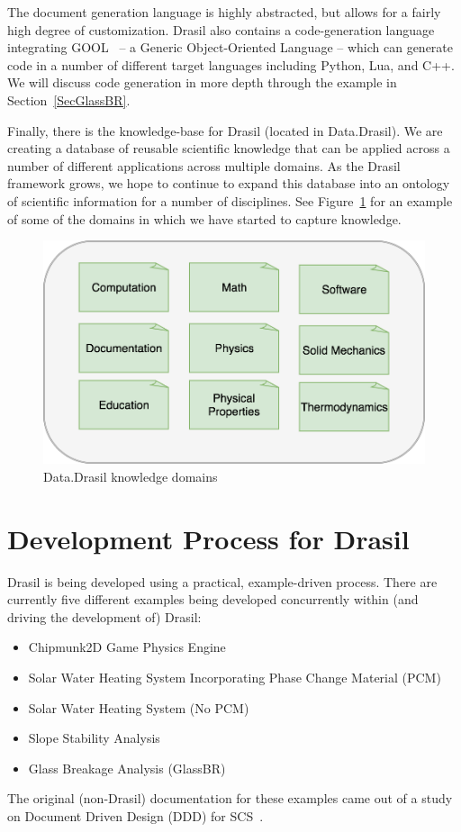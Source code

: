 \documentclass[sigconf]{acmart}
\begin{document}
The document generation language is highly abstracted, but allows for a fairly
high degree of customization. Drasil also contains a code-generation language
integrating GOOL~\cite{Costabile2012} -- a Generic Object-Oriented Language -- which can
generate code in a number of different target languages including Python, Lua,
and C++.  We will discuss code generation in more depth through the example in
Section~\ref{SecGlassBR}.

Finally, there is the knowledge-base for Drasil (located in Data.Drasil). We 
are creating a database of reusable scientific knowledge that can be applied 
across a number of different applications across multiple domains. As the 
Drasil framework grows, we hope to continue to expand this database into an 
ontology of scientific information for a number of disciplines. See 
Figure~\ref{ontology} for an example of some of the domains in which we have 
started to capture knowledge.

\begin{figure}
	\includegraphics[width=.5\textwidth]{figures/ontology.png}
	\caption{Data.Drasil knowledge domains}
	\label{ontology}
\end{figure}

\section{Development Process for Drasil} \label{SecDevProcess}

Drasil is being developed using a practical, example-driven process. There are 
currently five different examples being developed concurrently within (and 
driving the development of) Drasil:

\begin{itemize}
\item Chipmunk2D Game Physics Engine
\item Solar Water Heating System Incorporating Phase Change Material (PCM)
\item Solar Water Heating System (No PCM)
\item Slope Stability Analysis
\item Glass Breakage Analysis (GlassBR)
\end{itemize}
The original (non-Drasil) documentation for these examples came out of a study
on Document Driven Design (DDD) for SCS~\cite{SmithJegatheesanAndKelly2016}.
\end{document}
